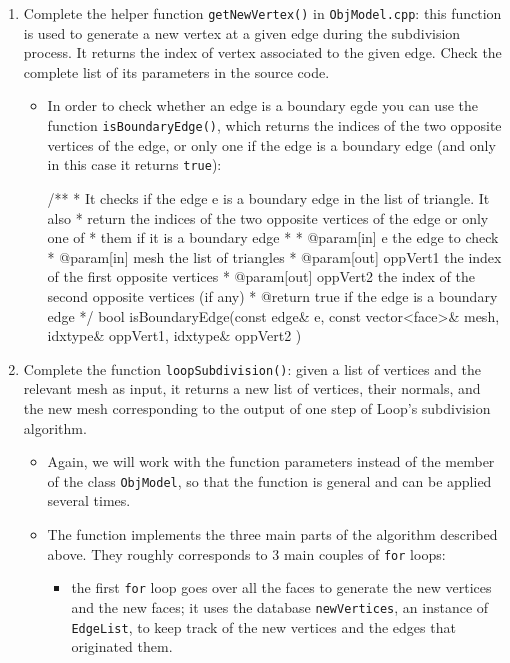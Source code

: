 \documentclass[a4paper,11pt]{article}
\newcommand{\hilight}[1]{\colorbox{bg}{#1}}
\newcommand{\coden}[1]{\texttt{#1}}
\newcommand{\code}[1]{\hilight{\texttt{#1}}}
\begin{document}
\begin{enumerate}
    \item Complete the helper function \code{getNewVertex()} in \coden{ObjModel.cpp}: this function is used to generate a new vertex at a given edge during the subdivision process. It returns the index of vertex associated to the given edge. Check the complete list of its parameters in the source code. 
    \begin{itemize}
        \item In order to check whether an edge is a boundary egde you can use the function \code{isBoundaryEdge()}, which returns the indices of the two opposite vertices of the edge, or only one if the edge is a boundary edge (and only in this case it returns \coden{true}):

{\smaller[2]
\begin{cppcode}
/**
 * It checks if the edge e is a boundary edge in the list of triangle. It also 
 * return the indices of the two opposite vertices of the edge or only one of 
 * them if it is a boundary edge
 * 
 * @param[in] e the edge to check
 * @param[in] mesh the list of triangles
 * @param[out] oppVert1 the index of the first opposite vertices 
 * @param[out] oppVert2 the index of the second opposite vertices (if any)
 * @return true if the edge is a boundary edge
 */
bool isBoundaryEdge(const edge& e, const vector<face>& mesh, idxtype& oppVert1, idxtype& oppVert2 )
\end{cppcode}    
}

    \end{itemize}
    \item Complete the function \code{loopSubdivision()}: given a list of vertices and the relevant mesh as input, it returns a new list of vertices, their normals, and the new mesh corresponding to the output of one step of Loop's subdivision algorithm. 

    \begin{itemize}
        \item Again, we will work with the function parameters instead of the member of the class \coden{ObjModel}, so that the function is general and can be applied several times.

        \item The function implements the three main parts of the algorithm described above. They roughly corresponds to 3 main couples of \coden{for} loops:
        \begin{itemize}
            \item the first \coden{for} loop goes over all the faces to generate the new vertices and the new faces; it uses the database \code{newVertices}, an instance of \coden{EdgeList}, to keep track of the new vertices and the edges that originated them.


\end{itemize}
\end{itemize}
\end{enumerate}
\end{document}
